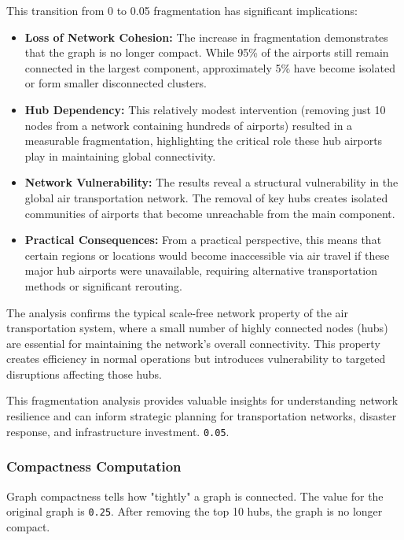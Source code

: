 \documentclass[12pt]{article}
\begin{document}
    This transition from 0 to 0.05 fragmentation has significant implications:
    
    \begin{itemize}
        \item \textbf{Loss of Network Cohesion:} The increase in fragmentation demonstrates that the graph is no longer compact. While 95\% of the airports still remain connected in the largest component, approximately 5\% have become isolated or form smaller disconnected clusters.
        
        \item \textbf{Hub Dependency:} This relatively modest intervention (removing just 10 nodes from a network containing hundreds of airports) resulted in a measurable fragmentation, highlighting the critical role these hub airports play in maintaining global connectivity.
        
        \item \textbf{Network Vulnerability:} The results reveal a structural vulnerability in the global air transportation network. The removal of key hubs creates isolated communities of airports that become unreachable from the main component.
        
        \item \textbf{Practical Consequences:} From a practical perspective, this means that certain regions or locations would become inaccessible via air travel if these major hub airports were unavailable, requiring alternative transportation methods or significant rerouting.
    \end{itemize}
    
    The analysis confirms the typical scale-free network property of the air transportation system, where a small number of highly connected nodes (hubs) are essential for maintaining the network's overall connectivity. This property creates efficiency in normal operations but introduces vulnerability to targeted disruptions affecting those hubs.
    
    This fragmentation analysis provides valuable insights for understanding network resilience and can inform strategic planning for transportation networks, disaster response, and infrastructure investment.
    \texttt{0.05}.

    \subsubsection{Compactness Computation}
    Graph compactness tells how "tightly" a graph is connected. The value for the original graph is \texttt{0.25}. After removing the top 10 hubs, the graph is no longer compact.
\end{document}
